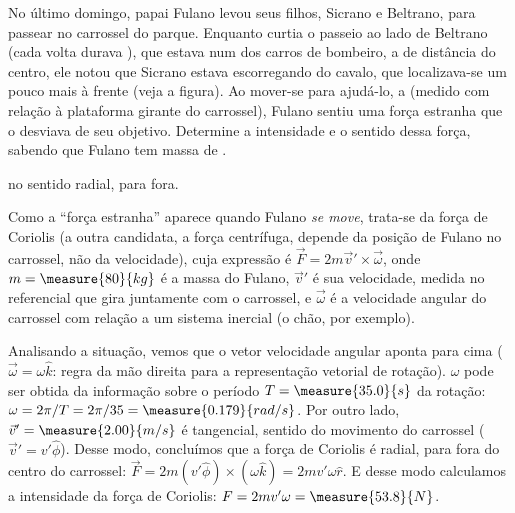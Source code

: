 \begin{question}
	No último domingo, papai Fulano levou seus filhos, Sicrano e Beltrano, para passear no carrossel do parque.
	Enquanto curtia o passeio ao lado de Beltrano (cada volta durava ), que estava num dos carros de bombeiro, a  de distância do centro, ele notou que Sicrano estava escorregando do cavalo, que localizava-se um pouco mais à frente (veja a figura).
	Ao mover-se para ajudá-lo, a  (medido com relação à plataforma girante do carrossel), Fulano sentiu uma força estranha que o desviava de seu objetivo.
	Determine a intensidade e o sentido dessa força, sabendo que Fulano tem massa de .


	\begin{answer}
		 no sentido radial, para fora.
	\end{answer}

	\begin{solution}
		Como a ``força estranha'' aparece quando Fulano \emph{se move}, trata-se da força de Coriolis (a outra candidata, a força centrífuga, depende da posição de Fulano no carrossel, não da velocidade), cuja expressão é $\vec F = 2m\vec v' \times \vec \omega$, onde $m = \measure{80}{kg}$ é a massa do Fulano, $\vec v'$ é sua velocidade, medida no referencial que gira juntamente com o carrossel, e $\vec\omega$ é a velocidade angular do carrossel com relação a um sistema inercial (o chão, por exemplo).

		Analisando a situação, vemos que o vetor velocidade angular aponta para cima ($\vec\omega = \omega\hat k$: regra da mão direita para a representação vetorial de rotação). $\omega$ pode ser obtida da informação sobre o período $T = \measure{35.0}{s}$ da rotação: $\omega = 2\pi/T = 2\pi/35 = \measure{0.179}{rad/s}$. Por outro lado, $\vec v' = \measure{2.00}{m/s}$ é tangencial, sentido do movimento do carrossel ($\vec v' = v'\hat \phi$).
		Desse modo, concluímos que a força de Coriolis é radial, para fora do centro do carrossel: $\vec F = 2m(v'\hat \phi)\times(\omega \hat k) = 2mv'\omega \hat r$. E desse modo calculamos a intensidade da força de Coriolis: $F = 2mv'\omega = \measure{53.8}{N}$.
	\end{solution}
\end{question}